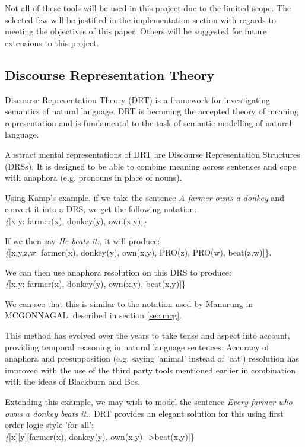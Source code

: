 Not all of these tools will be used in this project due to the limited scope. The selected few will be justified in the implementation section with regards to meeting the objectives of this paper. Others will be suggested for future extensions to this project.


\subsection{Discourse Representation Theory}
\label{sec:drt}
Discourse Representation Theory (DRT)\cite{kamp1993discourse} is a framework for investigating semantics of natural language. DRT is becoming the accepted theory of meaning representation\cite{BasileBosEvangVenhuizen2012LREC}\cite{blackburn2008computational} and is fundamental to the task of semantic modelling of natural language.

Abstract mental representations of DRT are Discourse Representation Structures (DRSs). It is designed to be able to combine meaning across sentences and cope with anaphora (e.g. pronouns in place of nouns). 

Using Kamp's example, if we take the sentence \textit{A farmer owns a donkey} and convert it into a DRS, we get the following notation:\\
\textit\{[x,y: farmer(x), donkey(y), own(x,y)]\}

If we then say \textit{He beats it.}, it will produce:\\
\textit\{[x,y,z,w: farmer(x), donkey(y), own(x,y), PRO(z), PRO(w), beat(z,w)]\}.

We can then use anaphora resolution on this DRS to produce:\\
\textit\{[x,y: farmer(x), donkey(y), own(x,y), beat(x,y)]\}

We can see that this is similar to the notation used by Manurung in MCGONNAGAL, described in section \ref{sec:mcg}.

This method has evolved over the years to take tense and aspect into account, providing temporal reasoning in natural language sentences. Accuracy of anaphora and presupposition (e.g. saying 'animal' instead of 'cat') resolution has improved with the use of the third party tools mentioned earlier in combination with the ideas of Blackburn and Bos\cite{blackburn2008computational}.

Extending this example, we may wish to model the sentence \textit{Every farmer who owns a donkey beats it.}. DRT provides an elegant solution for this using first order logic style 'for all':\\
\textit\{[x][y][farmer(x), donkey(y), own(x,y) -\textgreater beat(x,y)]\}


